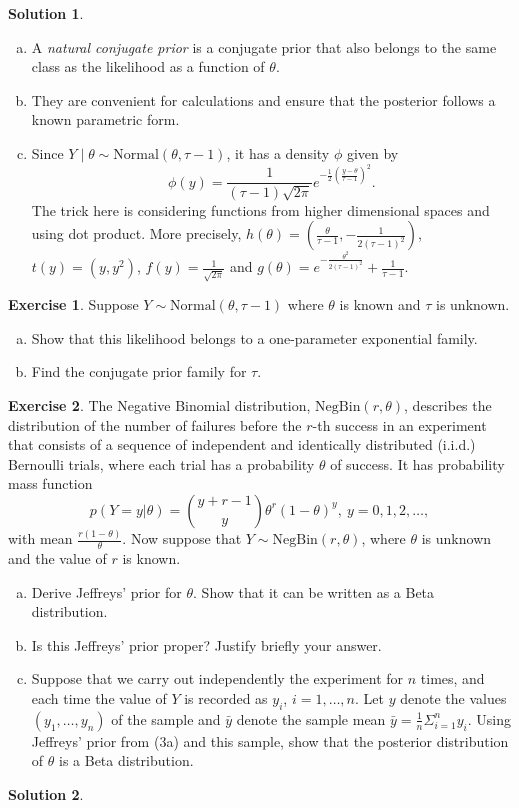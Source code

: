 \documentclass{article}
\theoremstyle{plain}
\theoremstyle{definition}
\newtheorem{exercise}{Exercise}
\newtheorem*{sol*}{Solution}
\begin{document}
\begin{sol*}\
\begin{enumerate}[(a)]
\item A \emph{natural conjugate prior} is a conjugate prior that also belongs to the same class as the likelihood as a function of $\theta$.
\item They are convenient for calculations and ensure that the posterior follows a known parametric form. 
\item Since $Y\mid\theta\sim\mathrm{Normal}(\theta,\tau-1)$, it has a density  $\phi$ given by
\[
\phi(y)=\frac{1}{(\tau-1)\sqrt{2\pi}}e^{-\frac{1}{2}(\frac{y-\theta}{\tau-1})^2}.
\]
The trick here is considering functions from higher dimensional spaces and using dot product. More precisely, $h(\theta)=(\frac{\theta}{\tau-1},-\frac{1}{2(\tau-1)^2})$, $t(y)=(y,y^2)$, $f(y)=\frac{1}{\sqrt{2\pi}}$ and $g(\theta)= e^{-\frac{\theta^2}{2(\tau-1)^2}}+\frac{1}{\tau-1}$.
\end{enumerate}
\end{sol*}

\begin{exercise}
Suppose $Y \sim \mathrm{Normal}(θ, τ-1)$ where $θ$ is known and $τ$ is unknown.
\begin{enumerate}[(a)]
\item Show that this likelihood belongs to a one-parameter exponential
family.
\item Find the conjugate prior family for $τ$.
\end{enumerate}
\end{exercise}



\begin{exercise}

The Negative Binomial distribution, $\mathrm{NegBin}(r, θ)$, describes the distribution of the number of failures before the $r$-th success in an experiment that consists of a sequence of independent and identically distributed (i.i.d.) Bernoulli trials, where each trial has a probability $θ$ of success. It has probability mass function
\[p(Y = y | θ) =\binom{y + r - 1}{y}θ^r(1 - θ)^y ,\ y = 0, 1, 2, \dots ,\]
with mean $\frac{r(1-θ)}{θ}$. Now suppose that $Y \sim \mathrm{NegBin}(r, θ)$, where $θ$ is unknown and the value of $r$ is known.
\begin{enumerate}[(a)]
\item Derive Jeffreys’ prior for $θ$. Show that it can be written as a Beta
distribution.
\item Is this Jeffreys’ prior proper? Justify briefly your answer.
\item Suppose that we carry out independently the experiment for $n$
times, and each time the value of $Y$ is recorded as $y_i$, $i = 1, \dots , n$. Let $y$ denote the values $(y_1, \dots , y_n)$ of the sample and $\bar{y}$ denote the sample mean $\bar{y} = \frac{1}{n}Σ^n_{i=1} y_i$. Using Jeffreys’ prior from (3a) and this sample, show that the posterior distribution of $θ$ is a Beta distribution. 
\end{enumerate}
\end{exercise}
\begin{sol*}\

\end{sol*}
\end{document}
